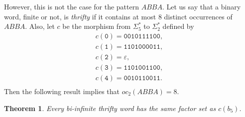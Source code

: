 \documentclass{article}
\theoremstyle{plain}
\newtheorem{theorem}{Theorem}
\theoremstyle{definition}
\theoremstyle{remark}
\begin{document}
However, this is not the case for the pattern $ABBA$.
Let us say that a binary word, finite or not, is \emph{thrifty} if it contains at most 8 distinct occurrences of $ABBA$.
Also, let $c$ be the morphism from $\Sigma_5^*$ to $\Sigma_2^*$ defined by
$$\begin{array}{l}
 c(\texttt{0})=\texttt{0010111100},\\
 c(\texttt{1})=\texttt{1101000011},\\
 c(\texttt{2})=\varepsilon,\\
 c(\texttt{3})=\texttt{1101001100},\\
 c(\texttt{4})=\texttt{0010110011}.\\
\end{array}$$
Then the following result implies that $oc_2(ABBA)=8$.
\begin{theorem}
Every bi-infinite thrifty word has the same factor set as $c(b_5)$.
\end{theorem}
\end{document}
